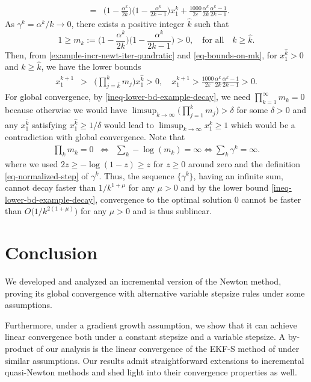 \documentclass[final,numbook]{svjour3}
\begin{document}
\begin{example}
\begin{eqnarray}
  &=& \bigg(1 - \frac{\alpha^k}{2k}\bigg) \bigg(1 - \frac{\alpha^k}{2k-1} \bigg) x_1^k + \frac{1000}{2\varepsilon}  \frac{\alpha^k}{ 2k}\frac{\alpha^k - 1}{2k - 1}. \label{example-incr-newt-iter-quadratic} 
  \end{eqnarray}
As $\gamma^k = \alpha^k/k \to 0$, there exists a positive integer $\hat k$ such that 
  \begin{equation}\label{eq-bounds-on-mk} 1 \geq  m_k := \bigg(1 - \frac{\alpha^k}{2k}\bigg) \bigg(1 - \frac{\alpha^k}{2k-1} \bigg)> 0, \quad \mbox{for all} \quad k\geq \hat k.
  \end{equation}
Then, from \eqref{example-incr-newt-iter-quadratic} and \eqref{eq-bounds-on-mk}, for $x_1^{\hat k}>0$ and $k \geq \hat k$, we have the lower bounds
\begin{eqnarray}\label{ineq-lower-bd-example-decay} x_1^{k+1} &>& \big(\prod_{j=\bar k}^{k} m_j\big)x_1^{\hat k} > 0, \quad
  x_1^{k+1} > \frac{1000}{2\varepsilon}  \frac{\alpha^k}{ 2k}\frac{\alpha^k - 1}{2k - 1}>0. 
\end{eqnarray}
For global convergence, by \eqref{ineq-lower-bd-example-decay}, we need $\prod_{k=1}^\infty m_k = 0$ because otherwise we would have $\limsup_{k\to \infty} \big(\prod_{j=1}^k m_j\big) > \delta$ for some $\delta>0$ and 
any $x_1^{\bar k}$ satisfying $x_1^{\hat k} \geq 1/\delta$ would lead to
 $\limsup_{k\to\infty} x_1^k \geq 1$ which would be a contradiction with global convergence.  
Note that
   \begin{eqnarray*} \prod_k m_k = 0 &\iff & \sum_k -\log(m_k) = \infty 
    \iff  \sum_k \gamma^k = \infty.
    \end{eqnarray*}
where we used $2z \geq -\log(1-z)\geq z$ for $z\geq 0$ around zero and the definition \eqref{eq-normalized-step} of $\gamma^k$. Thus, the sequence $\{\gamma^k\}$, having an infinite sum, cannot decay faster than $1/k^{1+\mu}$ for any $\mu > 0$ and by the lower bound \eqref{ineq-lower-bd-example-decay}, 
convergence to the optimal solution 0 cannot be faster than $O\big(1/k^{2(1+\mu)}\big)$ for any $\mu>0$ and is thus sublinear.
  
\end{example}
\section{Conclusion}\label{sec-discussion-and-future}
We developed and analyzed an incremental version of the Newton method, proving its global convergence with alternative variable stepsize rules under some assumptions.

Furthermore, under a gradient growth assumption, we show that it can achieve linear convergence both under a constant stepsize and a variable stepsize. A by-product of our analysis is the linear convergence of the EKF-S method of \cite{AlgEkfs2003} under similar assumptions. 
Our results admit straightforward extensions to incremental quasi-Newton methods and shed light into their convergence properties as well.
 


   
\end{document}
